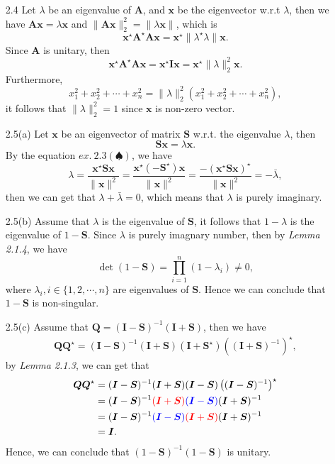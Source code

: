 \begin{enumerate}
    \item[2.4] {
    Let $\lambda$ be an eigenvalue of $\bm{A}$, and $\bm{x}$ be the eigenvector w.r.t $\lambda$, then we have $\bm{Ax} = \lambda \bm{x}$ and $\| \bm{Ax} \|_2^2 = \| \lambda \bm{x} \|$, which is
    $$
    \bm{x}^{\star} \bm{A}^{\star} \bm{Ax} = \bm{x}^{\star} \| \lambda^\star \lambda \| \bm{x}. 
    $$
    Since $\bm{A}$ is unitary, then
    $$
    \bm{x}^{\star} \bm{A}^\star \bm{A} \bm{x} = \bm{x}^{\star} \bm{Ix} = \bm{x}^{\star} \| \lambda \|_2^2 \bm{x}.
    $$
    Furthermore,
    $$
    x_1^2 + x_2^2 + \cdots + x_n^2 = \| \lambda \|_2^2(x_1^2 + x_2^2 + \cdots + x_n^2),
    $$
    it follows that $\| \lambda \|_2^2 = 1$ since $\bm{x}$ is non-zero vector.
    }
    
    \item[2.5(a)] {
     Let $\bm{x}$ be an eigenvector of matrix $\bm{S}$ w.r.t. the eigenvalue $\lambda$, then 
     \[\bm{S}\bm{x} = \lambda \bm{x}.\]
     By the equation $ex.~2.3(\spadesuit)$, we have
    $$
    \lambda = \frac{\bm{x}^{\star} \bm{S} \bm{x} }{ \| \bm{x} \|^{2}} = \frac{\bm{x}^{\star} (-\bm{S}^{\star}) \bm{x} }{ \| \bm{x} \|^{2}} = \frac{-(\bm{x}^{\star} \bm{S} \bm{x} )^{\star}}{ \| \bm{x} \|^{2}} = -\bar{\lambda},
    $$
    then we can get that $\lambda + \bar{\lambda} = 0$, which means that $\lambda$ is purely imaginary.
    }
    
    \item[2.5(b)] {
    Assume that $\lambda$ is the eigenvalue of $\bm{S}$, it follows that $1- \lambda$ is the eigenvalue of $1 - \bm{S}$. Since $\lambda$ is purely imagnary number, then by \textit{Lemma 2.1.4}, we have
    $$
    \det{(1-\bm{S})}  = \prod_{i=1}^{n} (1 - \lambda_i) \neq 0,
    $$
    where $\lambda_i, i \in \{1, 2, \cdots, n\}$ are eigenvalues of $\bm{S}$. Hence we can conclude that $1-\bm{S}$ is non-singular. 
    }
    
    \item[2.5(c)] {
        Assume that $\bm{Q} = (\bm{I} - \bm{S})^{-1}(\bm{I} + \bm{S})$, then we have
        $$
        \begin{aligned}
        \bm{Q}\bm{Q}^{\star} = (\bm{I}-\bm{S})^{-1} (\bm{I} + \bm{S}) (\bm{I} + \bm{S}^{\star})\left((\bm{I} + \bm{S})^{-1}\right)^{\star},
        \end{aligned}
        $$
        by \textit{Lemma 2.1.3}, we can get that
        $$
        \begin{aligned}
        \bm{Q}\bm{Q}^{\star} &= (\bm{I}-\bm{S})^{-1} (\bm{I} + \bm{S}) (\bm{I} - \bm{S})\left((\bm{I} - \bm{S})^{-1}\right)^{\star}\\
        &= (\bm{I}-\bm{S})^{-1} \textcolor{red}{(\bm{I} + \bm{S})}\textcolor{blue}{(\bm{I} - \bm{S})} (\bm{I} + \bm{S})^{-1} \\
        &= (\bm{I}-\bm{S})^{-1} \textcolor{blue}{(\bm{I} - \bm{S})}\textcolor{red}{(\bm{I} + \bm{S})} (\bm{I} + \bm{S})^{-1} \\
        &= \bm{I}.
        \end{aligned} 
        $$
        Hence, we can conclude that $(1-\bm{S})^{-1}(1-\bm{S})$ is unitary.
    }
    

\end{enumerate}
